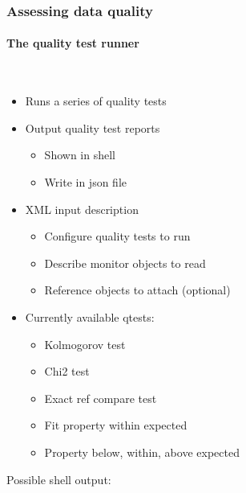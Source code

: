 \documentclass[presentation, 10pt]{beamer}
\begin{document}
\begin{frame}
  \frametitle{Assessing data quality}
  \framesubtitle{The quality test runner}
  \footnotesize
  \begin{minipage}{0.5\linewidth}
    ~ \\
    \begin{itemize}
      \item Runs a series of quality tests
      \item Output quality test reports
      \begin{itemize}
        \scriptsize
        \item Shown in shell
        \item Write in json file
      \end{itemize}
      \item XML input description
      \begin{itemize}
        \scriptsize
        \item Configure quality tests to run
        \item Describe monitor objects to read
        \item Reference objects to attach (optional)
      \end{itemize}
      \item Currently available qtests:
      \begin{itemize}
        \scriptsize
        \item Kolmogorov test
        \item Chi2 test
        \item Exact ref compare test 
        \item Fit property within expected
        \item Property below, within, above expected
      \end{itemize}
    \end{itemize}    
    Possible shell output:
  \end{minipage}
  \begin{minipage}{0.48\linewidth}
    \begin{center}

\end{center}
\end{minipage}
\end{frame}
\end{document}
